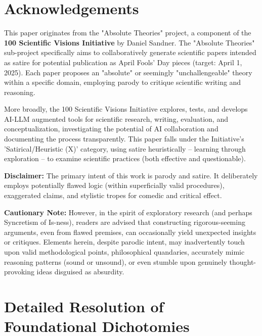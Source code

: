 \documentclass{article}
\begin{document}
\clearpage

\section*{Acknowledgements}

This paper originates from the "Absolute Theories" project, a component of the \textbf{100 Scientific Visions Initiative} by Daniel Sandner. The "Absolute Theories" sub-project specifically aims to collaboratively generate scientific papers intended as satire for potential publication as April Fools' Day pieces (target: April 1, 2025). Each paper proposes an "absolute" or seemingly "unchallengeable" theory within a specific domain, employing parody to critique scientific writing and reasoning.

More broadly, the 100 Scientific Visions Initiative explores, tests, and develops AI-LLM augmented tools for scientific research, writing, evaluation, and conceptualization, investigating the potential of AI collaboration and documenting the process transparently. This paper falls under the Initiative's 'Satirical/Heuristic (X)' category, using satire heuristically – learning through exploration – to examine scientific practices (both effective and questionable).

\textbf{Disclaimer:} The primary intent of this work is parody and satire. It deliberately employs potentially flawed logic (within superficially valid procedures), exaggerated claims, and stylistic tropes for comedic and critical effect.

\textbf{Cautionary Note:} However, in the spirit of exploratory research (and perhaps Syncretism of Is-ness), readers are advised that constructing rigorous-seeming arguments, even from flawed premises, can occasionally yield unexpected insights or critiques. Elements herein, despite parodic intent, may inadvertently touch upon valid methodological points, philosophical quandaries, accurately mimic reasoning patterns (sound or unsound), or even stumble upon genuinely thought-provoking ideas disguised as absurdity.


\appendix

\section{Detailed Resolution of Foundational Dichotomies}
\end{document}
